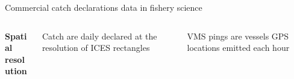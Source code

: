 \documentclass[
  10pt,
  ignorenonframetext,
]{beamer}
\begin{document}
\begin{frame}{Commercial catch declarations data in fishery science}
\begin{columns}
\begin{column}{0.1\textwidth}
\center \scriptsize {\bf Spatial \\ resolution}
\end{column}
\begin{column}{0.45\textwidth}
\center \scriptsize Catch are daily declared at the resolution of ICES rectangles
\end{column}
\begin{column}{0.45\textwidth}
\center \scriptsize VMS pings are vessels GPS locations emitted each hour
\end{column}
\end{columns}
\tiny
{}

\end{frame}
\end{document}
